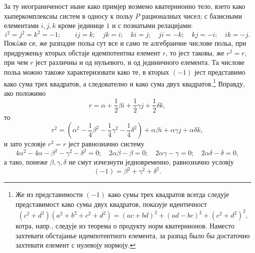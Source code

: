 ﻿\documentclass[11pt]{article}
\begin{document}
\noindent За ту неограниченост ныне како примјер возмемо кватернионно тело, взето како хыперкомплексны систем в односу к польу $P$ рационалных чисел; с базисными елементами $i,j,k$ кроме јединице $1$ и с познатыми релацијами:
\[
 i^2=j^2=k^2=-1;\qquad ij=k;\quad jk=i;\quad ki=j;\quad ji=-k;\quad kj=-i;\quad ik=-j.
\]
Покáже се, же разпадне польа сут все и само те алгебраичне числове польа, при придруженьу кторых обстаје идемпотентны елемент $r$, то јест таковы, же $r^2=r$, при чем $r$ јест различны и од нульевого, и од јединичного елемента. Та числове польа можно такоже характеризовати како те, в кторых $(-1)$ јест представимо како сума трех квадратов, а следователно и како сума двух квадратов.\footnote{Же из представимости $(-1)$ како сумы трех квадратов всегда следује представимост како сумы двух квадратов, показује идентичност
\[
(c^2+d^2)(a^2+b^2+c^2+d^2)=(ac+bd)^2+(ad-bc)^2+(c^2+d^2)^2,
\]
котра, напр., следује из теорема о продукту норм кватернионов. Наместо захтевати обстајанье идемпотентного елемента, за разпад было бы достаточно захтевати елемент с нулевоју нормоју.} Вправду, ако положимо
\[
        r=\alpha+\frac12\beta i+\frac12\gamma j+\frac12\delta k,
\]
то
\[
        r^2=\left(\alpha^2-\frac14\beta^2-\frac14\gamma^2-\frac14\delta^2\right)
          +\alpha\beta i+\alpha\gamma j+\alpha\delta k,
\]
и зато условје $r^2=r$ јест равнозначно систему
\[
4\alpha^2-4\alpha-\beta^2-\gamma^2-\delta^2=0;\quad
2\alpha\beta-\beta=0;\quad 2\alpha\gamma-\gamma=0;\quad 2\alpha\delta-\delta=0,
\]
а тако, понеже $\beta,\gamma,\delta$ не смут изчезнути једновременно, равнозначно условју
\[
        (-1)=\beta^2+\gamma^2+\delta^2.
\]
\end{document}
